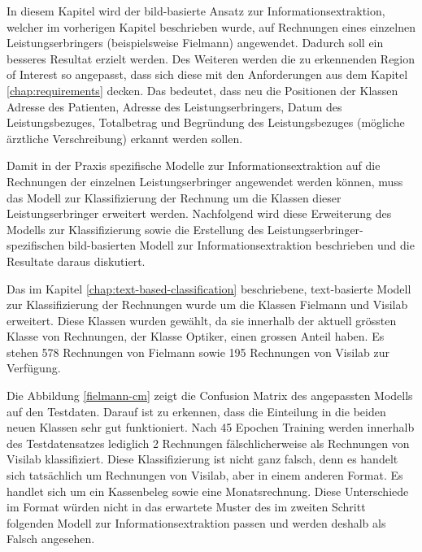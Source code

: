 In diesem Kapitel wird der bild-basierte Ansatz zur Informationsextraktion, welcher im vorherigen Kapitel beschrieben wurde, auf Rechnungen eines einzelnen Leistungserbringers (beispielsweise Fielmann) angewendet. Dadurch soll ein besseres Resultat erzielt werden. Des Weiteren werden die zu erkennenden Region of Interest so angepasst, dass sich diese mit den Anforderungen aus dem Kapitel \ref{chap:requirements} decken. Das bedeutet, dass neu die Positionen der Klassen Adresse des Patienten, Adresse des Leistungserbringers, Datum des Leistungsbezuges, Totalbetrag und Begründung des Leistungsbezuges (mögliche ärztliche Verschreibung) erkannt werden sollen.

Damit in der Praxis spezifische Modelle zur Informationsextraktion auf die Rechnungen der einzelnen Leistungserbringer angewendet werden können, muss das Modell zur Klassifizierung der Rechnung um die Klassen dieser Leistungserbringer erweitert werden. Nachfolgend wird diese Erweiterung des Modells zur Klassifizierung sowie die Erstellung des Leistungserbringer-spezifischen bild-basierten Modell zur Informationsextraktion beschrieben und die Resultate daraus diskutiert.

Das im Kapitel \ref{chap:text-based-classification} beschriebene, text-basierte Modell zur Klassifizierung der Rechnungen wurde um die Klassen Fielmann und Visilab erweitert. Diese Klassen wurden gewählt, da sie innerhalb der aktuell grössten Klasse von Rechnungen, der Klasse Optiker, einen grossen Anteil haben. Es stehen 578 Rechnungen von Fielmann sowie 195 Rechnungen von Visilab zur Verfügung.

Die Abbildung \ref{fielmann-cm} zeigt die Confusion Matrix des angepassten Modells auf den Testdaten. Darauf ist zu erkennen, dass die Einteilung in die beiden neuen Klassen sehr gut funktioniert. Nach 45 Epochen Training werden innerhalb des Testdatensatzes lediglich 2 Rechnungen fälschlicherweise als Rechnungen von Visilab klassifiziert. Diese Klassifizierung ist nicht ganz falsch, denn es handelt sich tatsächlich um Rechnungen von Visilab, aber in einem anderen Format. Es handlet sich um ein Kassenbeleg sowie eine Monatsrechnung. Diese Unterschiede im Format würden nicht in das erwartete Muster des im zweiten Schritt folgenden Modell zur Informationsextraktion passen und werden deshalb als Falsch angesehen.

